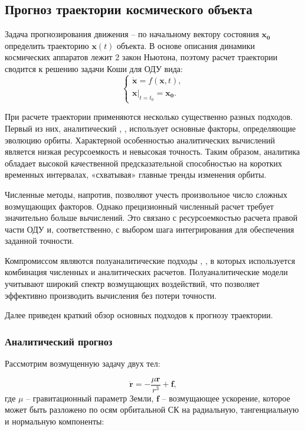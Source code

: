 \subsection{Прогноз траектории космического объекта}
Задача прогнозирования движения -- по начальному вектору состояния $\mathbf{x_0}$ определить траекторию $\mathbf{x}(t)$ объекта.
В основе описания динамики космических аппаратов лежит 2 закон Ньютона, 
поэтому расчет траектории сводится к решению задачи Коши для ОДУ вида:
\begin{equation}
    \begin{cases}
        \dot{\mathbf{x}} = f(\mathbf{x}, t), \\
        \mathbf{x} \big|_{t = t_0} = \mathbf{x_0}.
        \label{eq:prognoz_task}
    \end{cases}
\end{equation}

При расчете траектории применяются несколько существенно разных подходов. 
Первый из них, аналитический \cite{vallado2008}, \cite{Nazarenko1981}, использует основные факторы, определяющие эволюцию орбиты.
Характерной особенностью аналитических вычислений является низкая ресурсоемкость и невысокая точность.
Таким образом, аналитика обладает высокой качественной предсказательной способностью на коротких временных интервалах, 
«схватывая» главные тренды изменения орбиты.

Численные методы, напротив, позволяют учесть произвольное число сложных возмущающих факторов.
Однако прецизионный численный расчет требует значительно больше вычислений. 
Это связано с ресурсоемкостью расчета правой части ОДУ и,
соответственно, с выбором шага интегрирования для обеспечения заданной точности.

Компромиссом являются полуаналитические подходы \cite{tulin2018}, \cite{Nazarenko1981}, 
в которых используется комбинация численных и аналитических расчетов.
Полуаналитические модели учитывают широкий спектр возмущающих воздействий, 
что позволяет эффективно производить вычисления без потери точности.

Далее приведен краткий обзор основных подходов к прогнозу траектории.

\subsubsection{Аналитический прогноз}
Рассмотрим возмущенную задачу двух тел:

\begin{equation}
    \ddot{\mathbf{r}} = - \frac{\mu \mathbf{r}}{r^3} + \mathbf{f},
    \label{eq:analyt_rv}
\end{equation}
где $\mu$ -- гравитационный параметр Земли, $\mathbf{f}$ -- возмущающее ускорение, которое может быть разложено по осям орбитальной СК на радиальную, тангенциальную и нормальную компоненты:

